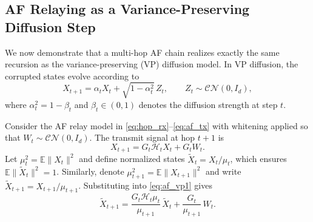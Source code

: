 \documentclass[journal]{IEEEtran}
\begin{document}
\subsection{AF Relaying as a Variance-Preserving Diffusion Step}
\label{Sec:ARdiffusion}

We now demonstrate that a multi-hop AF chain realizes exactly the same recursion as the variance-preserving (VP) diffusion model. 
In VP diffusion, the corrupted states evolve according to
\begin{equation}
    X_{t+1} = \alpha_t X_t + \sqrt{1-\alpha_t^2}\,Z_t,
    \qquad Z_t \sim \mathcal{CN}(0,I_d),
    \label{eq:vp_af_equiv}
\end{equation}
where $\alpha_t^2 = 1-\beta_t$ and $\beta_t \in (0,1)$ denotes the diffusion strength at step $t$.

Consider the AF relay model in \eqref{eq:hop_rx}–\eqref{eq:af_tx} with whitening applied so that $W_t \sim \mathcal{CN}(0,I_d)$. The transmit signal at hop $t+1$ is
\begin{equation}
    X_{t+1} = G_t \mathcal{H}_t X_t + G_t W_t.
    \label{eq:af_vp1}
\end{equation}
Let $\mu_t^2=\mathbb{E}\|X_t\|^2$ and define normalized states $\tilde{X}_t=X_t/\mu_t$, which ensures $\mathbb{E}\|\tilde{X}_t\|^2=1$. 
Similarly, denote $\mu_{t+1}^2=\mathbb{E}\|X_{t+1}\|^2$ and write $\tilde{X}_{t+1}=X_{t+1}/\mu_{t+1}$. 
Substituting into \eqref{eq:af_vp1} gives
\begin{equation}
    \tilde{X}_{t+1} = \frac{G_t \mathcal{H}_t \mu_t}{\mu_{t+1}}\,\tilde{X}_t + \frac{G_t}{\mu_{t+1}}\,W_t.
    \label{eq:af_vp2}
\end{equation}
\end{document}
